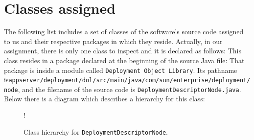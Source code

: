 \newpage
\section{Classes assigned}
The following list includes a set of classes of the software's source code assigned to us and their respective packages in which they reside.
Actually, in our assignment, there is only one class to inspect and it is declared as follows:
This class resides in a package declared at the beginning of the source Java file:
That package is inside a module called \texttt{Deployment Object Library}. \newline
Its pathname is\newline \texttt{appserver/deployment/dol/src/main/java/com/sun/enterprise/deployment/node}, and the filename of the source code is \texttt{DeploymentDescriptorNode.java}.
Below there is a diagram which describes a hierarchy for this class:
\begin{figure}[H]
	\centering
	\resizebox{2.5in}
	{!}{}
	\caption{Class hierarchy for \texttt{DeploymentDescriptorNode}.}
\end{figure}